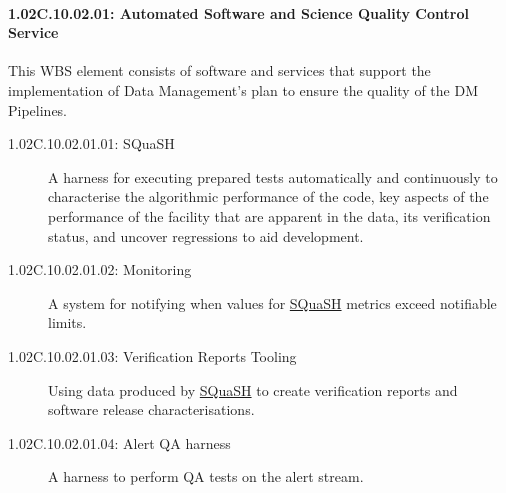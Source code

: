 \paragraph*{1.02C.10.02.01: Automated Software and Science Quality Control Service}
\label{wbs:1.02C.10.02.01}

This WBS element consists of software and services that support the
implementation of Data Management's plan to ensure the quality of the DM
Pipelines.

\begin{description}

\item[1.02C.10.02.01.01: SQuaSH]
  \label{wbs:1.02C.10.02.01.01}
  A harness for executing prepared tests automatically and continuously to
  characterise the algorithmic performance of the code, key aspects of the
  performance of the facility that are apparent in the data, its verification
  status, and uncover regressions to aid development.

\item[1.02C.10.02.01.02: Monitoring]
  A system for notifying when values for
  \hyperref[wbs:1.02C.10.02.01.01]{SQuaSH} metrics exceed notifiable limits.

\item[1.02C.10.02.01.03: Verification Reports Tooling]
  Using data produced by \hyperref[wbs:1.02C.10.02.01.01]{SQuaSH} to create
  verification reports and software release characterisations.

\item[1.02C.10.02.01.04: Alert QA harness]
  A harness to perform QA tests on the alert stream.

\end{description}
